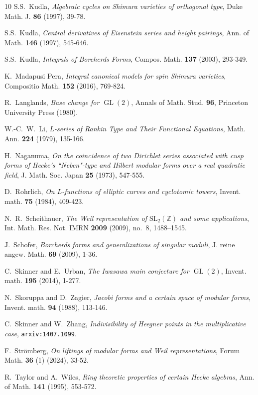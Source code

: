 \documentclass{amsart}
\theoremstyle{definition}
\theoremstyle{definition}
\theoremstyle{definition}
\begin{document}
\begin{thebibliography}{10}
 S.S.~Kudla, {\it{Algebraic cycles on Shimura varieties of orthogonal type}}, Duke Math. J. {\bf{86}} (1997), 39-78.

 S.S.~Kudla, {\it{Central derivatives of Eisenstein series and height pairings}}, Ann. of Math. {\bf{146}} (1997), 545-646.

 S.S.~Kudla, {\it{Integrals of Borcherds Forms}}, Compos. Math. {\bf{137}} (2003), 293-349.

 K.~Madapusi Pera, {\it{Integral canonical models for spin Shimura varieties}}, Compositio Math. {\bf{152}} (2016), 769-824.

 R.~Langlands, {\it{Base change for $\operatorname{GL}(2)$}}, Annals of Math. Stud. {\bf{96}}, Princeton University Press (1980).

 W.-C.~W.~Li, {\it{$L$-series of Rankin Type and Their Functional Equations}}, Math. Ann. {\bf{224}} (1979), 135-166.

 H.~Naganuma, {\it{On the coincidence of two Dirichlet series associated with cusp forms of Hecke's ``Neben"-type and Hilbert 
modular forms over a real quadratic field}}, J. Math. Soc. Japan {\bf{25}} (1973), 547-555.

 D.~Rohrlich, {\it{On $L$-functions of elliptic curves and cyclotomic towers}}, Invent. math. {\bf{75}} (1984), 409-423.

 N.~R.~Scheithauer, {\it{The Weil representation of $\mathrm{SL}_2(\mathbb{Z})$ and some applications}}, 
Int. Math. Res. Not. IMRN \textbf{2009} (2009), no.~8, 1488–1545. 

 J.~Schofer, {\it{Borcherds forms and generalizations of singular moduli}}, J. reine angew. Math. {\bf{69}} (2009), 1-36.

 C.~Skinner and E.~Urban, {\it{The Iwasawa main conjecture for $\operatorname{GL}(2)$}}, Invent. math. {\bf{195}} (2014), 1-277. 

 N.~Skoruppa and D.~Zagier, {\it{Jacobi forms and a certain space of modular forms}}, Invent. math. {\bf{94}} (1988), 113-146.

 C.~Skinner and W.~Zhang, {\it{Indivisibility of Heegner points in the multiplicative case}}, \texttt{arxiv:1407.1099}.

 F.~Str\"omberg, {\it{On liftings of modular forms and Weil representations}}, Forum Math. \textbf{36} (1) (2024), 33-52.

 R.~Taylor and A.~Wiles, {\it{Ring theoretic properties of certain Hecke algebras}}, Ann. of Math. {\bf{141}} (1995), 553-572.


\end{thebibliography}
\end{document}
